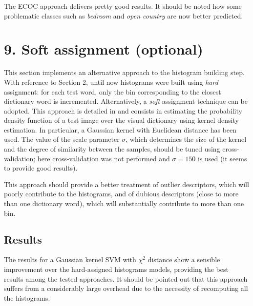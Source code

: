 \documentclass[12pt]{article}
\begin{document}
  The ECOC approach delivers pretty good results. It should be noted how some problematic classes such as \textit{bedroom} and \textit{open country} are now better predicted.



  \section*{9. Soft assignment (optional)}

  This section implements an alternative approach to the histogram building step. With reference to Section 2, until now histograms were built using \textit{hard} assignment: for each test word, only the bin corresponding to the closest dictionary word is incremented. Alternatively, a \textit{soft} assignment technique can be adopted. This approach is detailed in \cite{van2008kernel} and consists in estimating the probability density function of a test image over the visual dictionary using kernel density estimation. In particular, a Gaussian kernel with Euclidean distance has been used. The value of the scale parameter \( \sigma \), which determines the size of the kernel and the degree of similarity between the samples, should be tuned using cross-validation; here cross-validation was not performed and \( \sigma = 150 \) is used (it seems to provide good results).

  This approach should provide a better treatment of outlier descriptors, which will poorly contribute to the histograms, and of dubious descriptors (close to more than one dictionary word), which will substantially contribute to more than one bin.


  \subsection*{Results}

  The results for a Gaussian kernel SVM with \( \chi^2 \) distance show a sensible improvement over the hard-assigned histograms models, providing the best results among the tested approaches. It should be pointed out that this approach suffers from a considerably large overhead due to the necessity of recomputing all the histograms.
\end{document}
